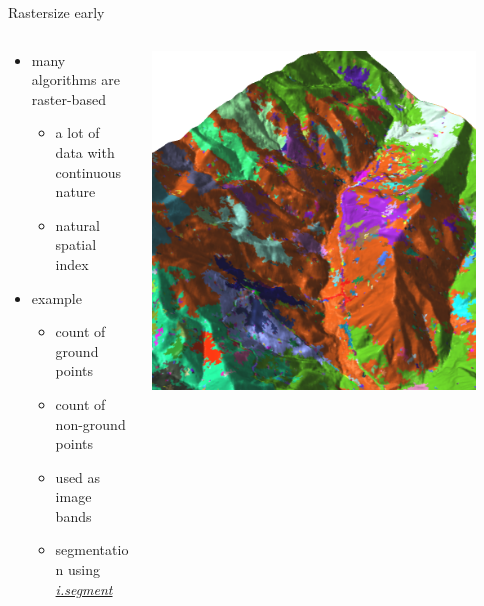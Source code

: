 \documentclass[xcolor={dvipsnames,usenames},beamer,aspectratio=169]{beamer}
\newcommand{\gmodule}[1]{\href{http://grass.osgeo.org/grass71/manuals/#1.html}{\emph{#1}}}
\begin{document}
\begin{frame}{Rastersize early}

\begin{columns}
\begin{column}{0.5\textwidth}

\begin{itemize}
  \item many algorithms are raster-based
  \begin{itemize}
    \item a lot of data with continuous nature
    \item natural spatial index
  \end{itemize}
  \item example
  \begin{itemize}
    \item count of ground points
    \item count of non-ground points
    \item used as image bands
    \item segmentation using \gmodule{i.segment}
  \end{itemize}
\end{itemize}

\end{column}
\begin{column}{0.45\textwidth}

\begin{center}
  \includegraphics[width=0.9\textwidth]{grass/segment_on_counts}
\end{center}

\end{column}
\end{columns}

\end{frame}
\end{document}
